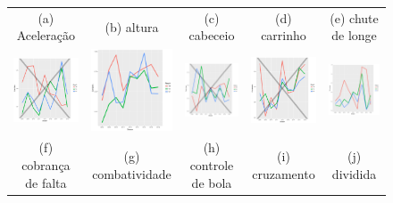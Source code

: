 \documentclass[review]{elsarticle}
\begin{document}
\begin{figure}
\begin{tabular}{ccccc}
\scriptsize{(a) Aceleração } & \scriptsize{(b) altura  } & \scriptsize{(c) cabeceio } & \scriptsize{(d) carrinho } & \scriptsize{(e) chute de longe }\\[3pt]
\includegraphics[width=25mm]{cobr_falta_result_trans} & \includegraphics[width=25mm]{combativ__result_trans} &   \includegraphics[width=25mm]{contr_bola_result_trans} &
  \includegraphics[width=25mm]{cruzamento_result_trans} & \includegraphics[width=25mm]{div_empe_result_trans} \\
 \scriptsize{(f) cobrança de falta } & \scriptsize{(g) combatividade } & \scriptsize{(h) controle de bola} & \scriptsize{(i) cruzamento} & \scriptsize{(j) dividida}\\[3pt]
 

\end{tabular}
\end{figure}
\end{document}
